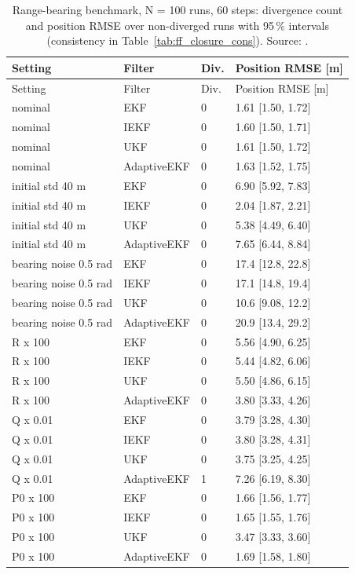 {\scriptsize
\begin{longtable}{llll}
\caption{Range-bearing benchmark, N = 100 runs, 60 steps: divergence count and position RMSE over non-diverged runs with 95\,\% intervals (consistency in Table~\ref{tab:ff_closure_cons}). Source: .}\label{tab:ff_closure}\\
\toprule
Setting & Filter & Div. & Position RMSE [m] \\
\midrule
\endfirsthead
\toprule
Setting & Filter & Div. & Position RMSE [m] \\
\midrule
\endhead
nominal & EKF & 0 & 1.61 [1.50, 1.72] \\
nominal & IEKF & 0 & 1.60 [1.50, 1.71] \\
nominal & UKF & 0 & 1.61 [1.50, 1.72] \\
nominal & AdaptiveEKF & 0 & 1.63 [1.52, 1.75] \\
initial std 40 m & EKF & 0 & 6.90 [5.92, 7.83] \\
initial std 40 m & IEKF & 0 & 2.04 [1.87, 2.21] \\
initial std 40 m & UKF & 0 & 5.38 [4.49, 6.40] \\
initial std 40 m & AdaptiveEKF & 0 & 7.65 [6.44, 8.84] \\
bearing noise 0.5 rad & EKF & 0 & 17.4 [12.8, 22.8] \\
bearing noise 0.5 rad & IEKF & 0 & 17.1 [14.8, 19.4] \\
bearing noise 0.5 rad & UKF & 0 & 10.6 [9.08, 12.2] \\
bearing noise 0.5 rad & AdaptiveEKF & 0 & 20.9 [13.4, 29.2] \\
R x 100 & EKF & 0 & 5.56 [4.90, 6.25] \\
R x 100 & IEKF & 0 & 5.44 [4.82, 6.06] \\
R x 100 & UKF & 0 & 5.50 [4.86, 6.15] \\
R x 100 & AdaptiveEKF & 0 & 3.80 [3.33, 4.26] \\
Q x 0.01 & EKF & 0 & 3.79 [3.28, 4.30] \\
Q x 0.01 & IEKF & 0 & 3.80 [3.28, 4.31] \\
Q x 0.01 & UKF & 0 & 3.75 [3.25, 4.25] \\
Q x 0.01 & AdaptiveEKF & 1 & 7.26 [6.19, 8.30] \\
P0 x 100 & EKF & 0 & 1.66 [1.56, 1.77] \\
P0 x 100 & IEKF & 0 & 1.65 [1.55, 1.76] \\
P0 x 100 & UKF & 0 & 3.47 [3.33, 3.60] \\
P0 x 100 & AdaptiveEKF & 0 & 1.69 [1.58, 1.80] \\
\bottomrule
\end{longtable}
}
